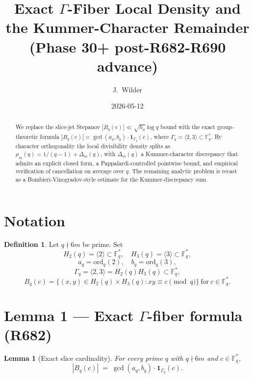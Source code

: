 \documentclass[12pt]{amsart}
\title{Exact $\Gamma$-Fiber Local Density and the Kummer-Character Remainder\\
{\small (Phase 30+ post-R682-R690 advance)}}
\author{J.\ Wilder}
\date{2026-05-12}
\newtheorem{lemma}{Lemma}
\theoremstyle{definition}
\newtheorem{definition}{Definition}
\theoremstyle{remark}
\begin{document}
\maketitle

\begin{abstract}
We replace the slice-jet Stepanov $|B_q(c)| \ll \sqrt{h_q}\log q$ bound with the exact
group-theoretic formula $|B_q(c)| = \gcd(a_q, b_q) \cdot \mathbf{1}_{\Gamma_q}(c)$,
where $\Gamma_q = \langle 2, 3 \rangle \subset \mathbb{F}_q^*$. By character orthogonality
the local divisibility density splits as $\rho_m(q) = 1/(q-1) + \Delta_m(q)$, with
$\Delta_m(q)$ a Kummer-character discrepancy that admits an explicit closed form,
a Pappalardi-controlled pointwise bound, and empirical verification of cancellation
on average over $q$. The remaining analytic problem is recast as a
Bombieri-Vinogradov-style estimate for the Kummer-discrepancy sum.
\end{abstract}

\section{Notation}

\begin{definition}
Let $q \nmid 6m$ be prime. Set
$$
H_2(q) = \langle 2 \rangle \subset \mathbb{F}_q^*, \quad H_3(q) = \langle 3 \rangle \subset \mathbb{F}_q^*,
$$
$$
a_q = \mathrm{ord}_q(2), \quad b_q = \mathrm{ord}_q(3),
$$
$$
\Gamma_q = \langle 2, 3 \rangle = H_2(q) H_3(q) \subset \mathbb{F}_q^*,
$$
$$
B_q(c) = \{(x, y) \in H_2(q) \times H_3(q) : x y \equiv c \pmod q\}\ \text{for}\ c \in \mathbb{F}_q^*.
$$
\end{definition}

\section{Lemma 1 --- Exact $\Gamma$-fiber formula (R682)}

\begin{lemma}[Exact slice cardinality]\label{lem:R682}
For every prime $q$ with $q \nmid 6m$ and $c \in \mathbb{F}_q^*$,
$$
|B_q(c)|
\;=\;
\gcd(a_q, b_q) \cdot \mathbf{1}_{\Gamma_q}(c).
$$
\end{lemma}
\end{document}

